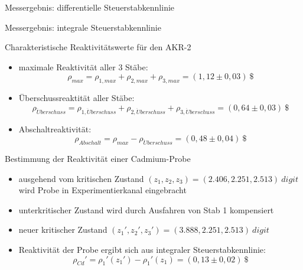 \documentclass[10pt]{beamer}
\begin{document}
 		\begin{frame}{Messergebnis: differentielle Steuerstabkennlinie}
 			\begin{figure}[hp]
 		 		\centering
 				\scalebox{0.4}{
 				
 				}
 			\end{figure}
 		\end{frame}
 		
 		\begin{frame}{Messergebnis: integrale Steuerstabkennlinie}
 		 	\begin{figure}[hp]
 		 		\centering
 		 		\scalebox{0.4}{
 		 		
 		 		}
 		 	\end{figure}
 		\end{frame}
 		
 		\begin{frame}{Charakteristische Reaktivitätswerte für den AKR-2}
 			\begin{itemize}
 				\item maximale Reaktivität aller 3 Stäbe:
 				 $$\rho_{max} = \rho_{1,max} + \rho_{2,max} + \rho_{3,max} = (1,12 \pm 0,03)\ \unit{\$}$$
 				\item Überschussreaktität aller Stäbe:
 				$$\rho_{\ddot{U}berschuss} = \rho_{1,\ddot{U}berschuss} + \rho_{2,\ddot{U}berschuss} + \rho_{3,\ddot{U}berschuss}  = (0,64 \pm 0,03)\ \unit{\$}$$
 				\item Abschaltreaktivität:
 				$$\rho_{Abschalt} = \rho_{max} - \rho_{\ddot{U}berschuss} = (0,48 \pm 0,04)\ \unit{\$}$$
 			\end{itemize}
 		\end{frame}
 		
 		\begin{frame}{Bestimmung der Reaktivität einer Cadmium-Probe}
 			\begin{itemize}
 				\item ausgehend vom kritischen Zustand $(z_1,z_2,z_3) = (2.406, 2.251, 2.513)\ \unit{digit}$ wird Probe in Experimentierkanal eingebracht
 				\item unterkritischer Zustand wird durch Ausfahren von Stab 1 kompensiert
 				\item neuer kritischer Zustand $(z_1\prime,z_2\prime,z_3\prime) = (3.888, 2.251, 2.513)\ \unit{digit}$
 				\item Reaktivität  der Probe ergibt sich aus integraler Steuerstabkennlinie:
 					$$\rho_{Cd}\prime = \rho_1\prime(z_1\prime) - \rho_1\prime(z_1) = (0,13 \pm 0,02)\ \unit{\$}$$
 			\end{itemize}
 		\end{frame}
\end{document}
